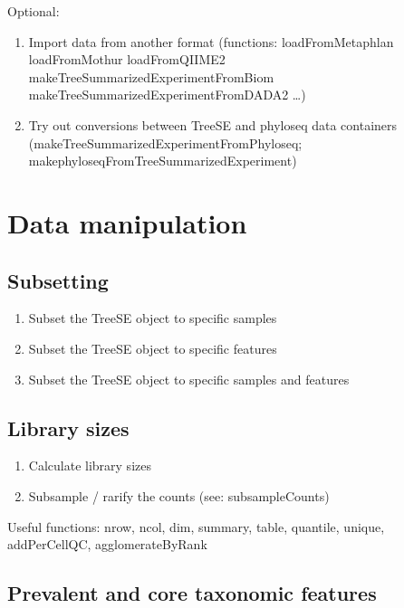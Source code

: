 \documentclass[
]{book}
\providecommand{\tightlist}{%
  \setlength{\itemsep}{0pt}\setlength{\parskip}{0pt}}
\begin{document}
Optional:

\begin{enumerate}
\def\labelenumi{\arabic{enumi}.}
\setcounter{enumi}{3}
\tightlist
\item
  Import data from another format (functions: loadFromMetaphlan \textbar{} loadFromMothur \textbar{} loadFromQIIME2 \textbar{} makeTreeSummarizedExperimentFromBiom \textbar{} makeTreeSummarizedExperimentFromDADA2 \ldots)
\item
  Try out conversions between TreeSE and phyloseq data containers (makeTreeSummarizedExperimentFromPhyloseq; makephyloseqFromTreeSummarizedExperiment)
\end{enumerate}

\hypertarget{data-manipulation}{%
\section{Data manipulation}\label{data-manipulation}}

\hypertarget{subsetting-1}{%
\subsection{Subsetting}\label{subsetting-1}}

\begin{enumerate}
\def\labelenumi{\arabic{enumi}.}
\tightlist
\item
  Subset the TreeSE object to specific samples
\item
  Subset the TreeSE object to specific features
\item
  Subset the TreeSE object to specific samples and features
\end{enumerate}

\hypertarget{library-sizes}{%
\subsection{Library sizes}\label{library-sizes}}

\begin{enumerate}
\def\labelenumi{\arabic{enumi}.}
\tightlist
\item
  Calculate library sizes
\item
  Subsample / rarify the counts (see: subsampleCounts)
\end{enumerate}

Useful functions: nrow, ncol, dim, summary, table, quantile, unique, addPerCellQC, agglomerateByRank

\hypertarget{prevalent-and-core-taxonomic-features}{%
\subsection{Prevalent and core taxonomic features}\label{prevalent-and-core-taxonomic-features}}
\end{document}
